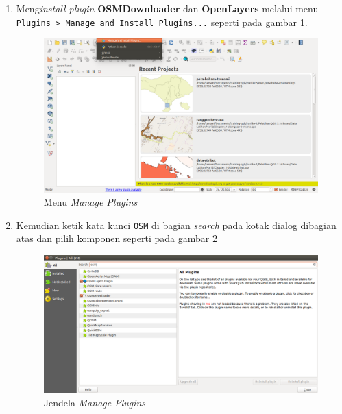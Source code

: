 \begin{enumerate}[1.]
  \item Meng\textit{install plugin} \textbf{OSMDownloader} dan \textbf{OpenLayers} melalui menu \texttt{Plugins > Manage and Install Plugins...} seperti pada gambar \ref{fig:managepluginsmenu}.
  
  \begin{figure}[H]
    \centering
    \includegraphics[width=1\textwidth]{./resources/001-manage-plugins-menu}
    \caption{Menu \textit{Manage Plugins}}
    \label{fig:managepluginsmenu}
  \end{figure}
  
  \item Kemudian ketik kata kunci \texttt{OSM} di bagian \textit{search} pada kotak dialog dibagian atas dan pilih komponen seperti pada gambar \ref{fig:osminstallwin}
  
  \begin{figure}[H]
    \centering
    \includegraphics[width=1\textwidth]{./resources/002-osm-install-win}
    \caption{Jendela \textit{Manage Plugins}}
    \label{fig:osminstallwin}
  \end{figure}
\end{enumerate}